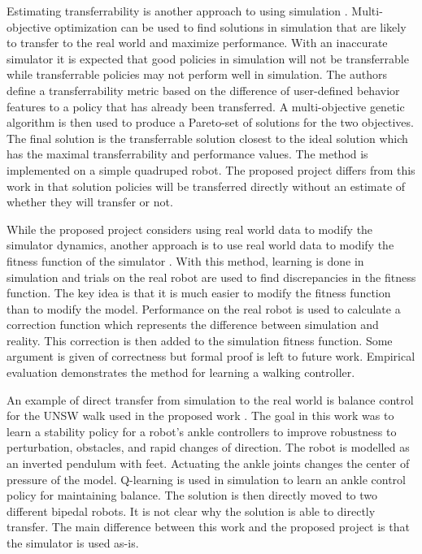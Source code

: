 \documentclass[12 pt]{article}
\begin{document}
Estimating transferrability is another approach to using simulation \cite{koos2010crossing}.
Multi-objective optimization can be used to find solutions in simulation that are likely to transfer to the real world and maximize performance. 
With an inaccurate simulator it is expected that good policies in simulation will not be transferrable while transferrable policies may not perform well in simulation.
The authors define a transferrability metric based on the difference of user-defined behavior features to a policy that has already been transferred.
A multi-objective genetic algorithm is then used to produce a Pareto-set of solutions for the two objectives. 
The final solution is the transferrable solution closest to the ideal solution which has the maximal transferrability and performance values.
The method is implemented on a simple quadruped robot. The proposed project differs from this work in that solution policies will be transferred directly without an estimate of whether they will transfer or not.

While the proposed project considers using real world data to modify the simulator dynamics, another approach is to use real world data to modify the fitness function of the simulator \cite{iocchi2007learning}.
With this method, learning is done in simulation and trials on the real robot are used to find discrepancies in the fitness function. 
The key idea is that it is much easier to modify the fitness function than to modify the model. 
Performance on the real robot is used to calculate a correction function which represents the difference between simulation and reality. 
This correction is then added to the simulation fitness function. 
Some argument is given of correctness but formal proof is left to future work. 
Empirical evaluation demonstrates the method for learning a walking controller.

An example of direct transfer from simulation to the real world is balance control for the UNSW walk used in the proposed work \cite{hengst2011learning}.
The goal in this work was to learn a stability policy for a robot's ankle controllers to improve robustness to perturbation, obstacles, and rapid changes of direction.
The robot is modelled as an inverted pendulum with feet. Actuating the ankle joints changes the center of pressure of the model. Q-learning is used in simulation to learn an ankle control policy for maintaining balance. The solution is then directly moved to two different bipedal robots. It is not clear why the solution is able to directly transfer. The main difference between this work and the proposed project is that the simulator is used as-is.
\end{document}
